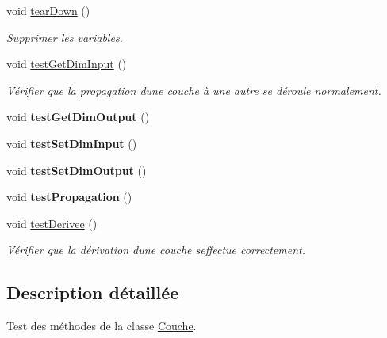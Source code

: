 \begin{DoxyCompactItemize}
void \hyperlink{classTestCouche_a52d776a6624d1ff323b9c390be482809}{tear\+Down} ()
\begin{DoxyCompactList}\small\item\em Supprimer les variables. \end{DoxyCompactList}\item 
\mbox{\label{classTestCouche_a91abe7adddd8687482a86316995d6d2b}} 
void \hyperlink{classTestCouche_a91abe7adddd8687482a86316995d6d2b}{test\+Get\+Dim\+Input} ()
\begin{DoxyCompactList}\small\item\em Vérifier que la propagation d\textquotesingle{}une couche à une autre se déroule normalement. \end{DoxyCompactList}\item 
\mbox{\label{classTestCouche_a9f2a6f3c97c55c920acb3d552a5ccc4d}} 
void {\bfseries test\+Get\+Dim\+Output} ()
\item 
\mbox{\label{classTestCouche_aa192e04275717fab674f977fb24cb59e}} 
void {\bfseries test\+Set\+Dim\+Input} ()
\item 
\mbox{\label{classTestCouche_a6762ad4ef2194ba9990f838d0543c851}} 
void {\bfseries test\+Set\+Dim\+Output} ()
\item 
\mbox{\label{classTestCouche_a2012666426b127d26006dca756986575}} 
void {\bfseries test\+Propagation} ()
\item 
\mbox{\label{classTestCouche_aefdfb41451d5a04fcc3e33704b900315}} 
void \hyperlink{classTestCouche_aefdfb41451d5a04fcc3e33704b900315}{test\+Derivee} ()
\begin{DoxyCompactList}\small\item\em Vérifier que la dérivation d\textquotesingle{}une couche s\textquotesingle{}effectue correctement. \end{DoxyCompactList}\end{DoxyCompactItemize}


\subsection{Description détaillée}
Test des méthodes de la classe \hyperlink{classCouche}{Couche}. 

